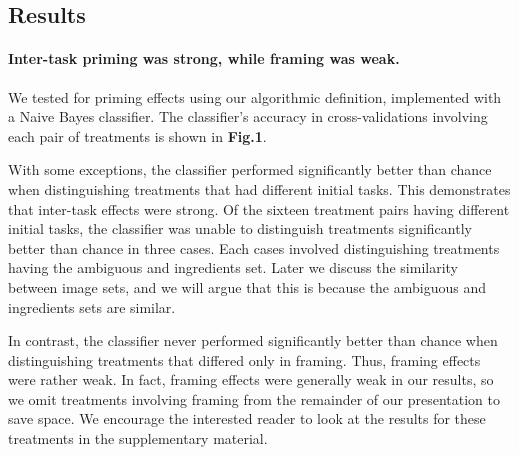 \documentclass[letterpaper]{article}
\begin{document}
\subsection*{Results}
\paragraph{Inter-task priming was strong, while framing was weak.}
We tested for priming effects using our algorithmic definition, implemented 
with a Naive Bayes classifier.  The classifier's accuracy
in cross-validations involving each pair of treatments is shown in 
\textbf{Fig.1}.

With some exceptions, the classifier performed significantly better 
than chance when distinguishing treatments that had different initial tasks.  
This demonstrates that inter-task effects were strong. Of the sixteen 
treatment pairs having different initial tasks, the classifier was unable to
distinguish treatments significantly better than chance in three cases.
Each cases involved distinguishing treatments having the ambiguous and 
ingredients set.  Later we discuss the similarity between image sets, and 
we will argue that this is because the ambiguous and ingredients sets are 
similar.

\begin{figure}
\end{figure}
In contrast, the classifier never performed significantly better than chance
when distinguishing treatments that differed only in framing.  Thus, framing 
effects were rather weak.  In fact, framing effects were generally weak in
our results, so we omit treatments involving framing from the remainder of
our presentation to save space.  We encourage the interested reader to look
at the results for these treatments in the supplementary material.
\end{document}
